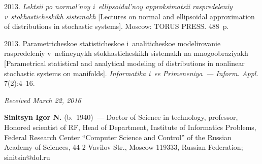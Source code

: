 \begin{multicols}{2}
{{\begin{thebibliography}{9}
 2013.
\textit{Lektsii po normal'noy i~ellipsoidal'noy approksimatsii raspredeleniy 
v~stokhasticheskikh sistemakh} [Lectures on normal and ellipsoidal approximation
of distributions in stochastic systems].  Moscow: TORUS PRESS.  488~p.


 2013.
Parametricheskoe statisticheskoe i~analiticheskoe modelirovanie raspredeleniy 
v~nelineynykh stokhasticheskikh sistemakh na mnogoobraziyakh
[Parametrical statistical and analytical modeling of distributions in nonlinear stochastic
systems on manifolds].
\textit{Informatika i~ee Primeneniya~--- Inform. Appl.}  7(2):4--16.

   \end{thebibliography}

 }
 }

\end{multicols}

\vspace*{-3pt}

\hfill{\small\textit{Received March 22, 2016}}

\Contrl

\noindent
\textbf{Sinitsyn Igor N.} (b.\ 1940)~---
Doctor of Science in technology, professor,
Honored scientist of RF, Head of Department, Institute of Informatics Problems, Federal Research Center ``Computer Science and
Control'' of the Russian Academy of Sciences, 44-2 Vavilov Str.,
Moscow 119333, Russian Federation; sinitsin@dol.ru


\label{end\stat}


\renewcommand{\bibname}{\protect\rm Литература}